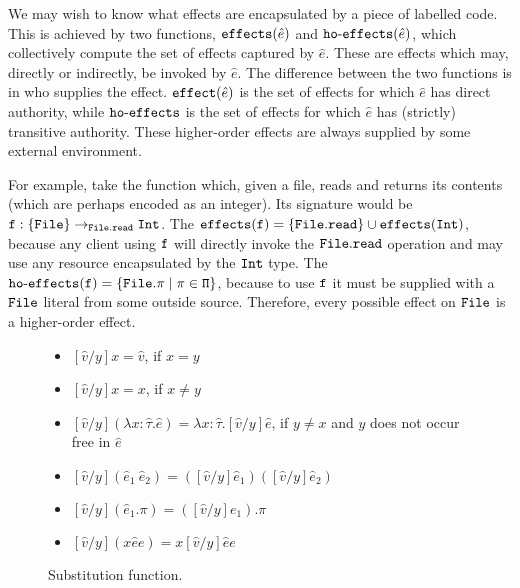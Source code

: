 \noindent
We may wish to know what effects are encapsulated by a piece of labelled code. This is achieved by two functions, $\mathtt{effects}(\hat e)$ and $\mathtt{ho \hbox{-} effects}(\hat e)$, which collectively compute the set of effects captured by $\hat e$. These are effects which may, directly or indirectly, be invoked by $\hat e$. The difference between the two functions is in who supplies the effect. $\mathtt{effect}(\hat e)$ is the set of effects for which $\hat e$ has direct authority, while $\mathtt{ho \hbox{-} effects}$ is the set of effects for which $\hat e$ has (strictly) transitive authority. These higher-order effects are always supplied by some external environment.

For example, take the function which, given a file, reads and returns its contents (which are perhaps encoded as an integer). Its signature would be $\mathtt{f : \{ File \} \rightarrow_{File.read} Int}$. The $\mathtt{\mathtt{effects}(f) = \{File.read\} \cup \mathtt{effects}(Int)}$, because any client using $\mathtt{f}$ will directly invoke the $\mathtt{File.read}$ operation and may use any resource encapsulated by the $\mathtt{Int}$ type. The $\mathtt{\mathtt{ho \hbox{-} effects}(f) = \{ File.\pi \mid \pi \in \Pi \} }$, because to use $\mathtt{f}$ it must be supplied with a $\mathtt{File}$ literal from some outside source. Therefore, every possible effect on $\mathtt{File}$ is a higher-order effect.\\


\begin{figure}[h]


\begin{itemize}
	\setlength\itemsep{-0.7em}
	\item[] $[\hat v/y]x = \hat v$, if $x = y$
	\item[] $[\hat v/y]x = x$, if $x \neq y$
	\item[] $[\hat v/y](\lambda x: \hat \tau. \hat e) = \lambda x: \hat \tau.[\hat v/y]\hat e$, if $y \neq x$ and $y$ does not occur free in $\hat e$
	\item[] $[\hat v/y](\hat e_1~\hat e_2) = ([\hat v/y]\hat e_1)([\hat v/y]\hat e_2)$
	\item[] $[\hat v/y](\hat e_1.\pi) = ([\hat v/y]e_1).\pi$
	\item[] $[\hat v/y]({x}{\hat e}{e}) = {x}{[\hat v/y]\hat e}{e}$
\end{itemize}

\vspace{-7pt}
\caption{Substitution function.}
\label{This is the label.}
\end{figure}


